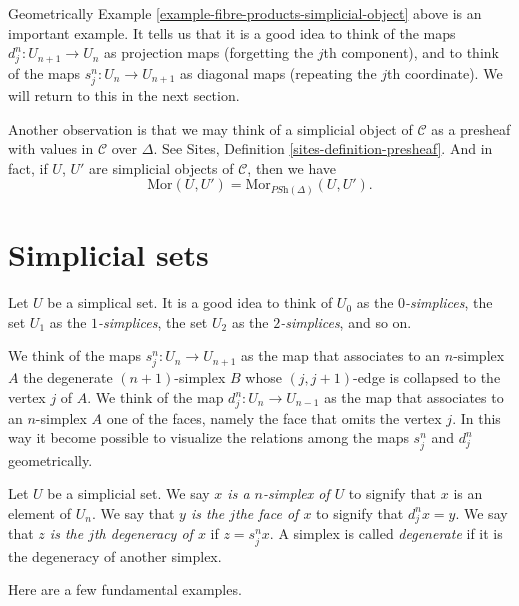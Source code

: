 \noindent
Geometrically Example \ref{example-fibre-products-simplicial-object}
above is an important example. It tells us that it is a good
idea to think of the maps $d^n_j : U_{n + 1} \to U_n$
as projection maps (forgetting the $j$th component),
and to think of the maps $s^n_j : U_n \to U_{n + 1}$
as diagonal maps (repeating the $j$th coordinate).
We will return to this in the next section.

\medskip\noindent
Another observation is that we may think of a simplicial
object of $\mathcal{C}$ as a presheaf with values in $\mathcal{C}$
over $\Delta$. See
Sites, Definition \ref{sites-definition-presheaf}.
And in fact, if $U$, $U'$ are simplicial objects
of $\mathcal{C}$, then we have
\begin{equation}
\label{simplicial-set-presheaf}
\text{Mor}(U, U') = \text{Mor}_{\textit{PSh}(\Delta)}(U, U').
\end{equation}


\section{Simplicial sets}
\label{section-simplicial-set}

\noindent
Let $U$ be a simplical set. It is a good idea to think of
$U_0$ as the {\it $0$-simplices}, the set $U_1$ as the
{\it $1$-simplices},
the set $U_2$ as the {\it $2$-simplices}, and so on.

\medskip\noindent
We think of the maps $s^n_j : U_n \to U_{n + 1}$ as
the map that associates to an $n$-simplex $A$ the degenerate
$(n + 1)$-simplex $B$ whose $(j, j + 1)$-edge is collapsed
to the vertex $j$ of $A$. We think of the map $d^n_j : U_n \to U_{n - 1}$
as the map that associates to an $n$-simplex $A$ one of the
faces, namely the face that omits the vertex $j$.
In this way it become possible to visualize the relations
among the maps $s^n_j$ and $d^n_j$ geometrically.

\begin{definition}
\label{definition-terminology-simplicial-sets}
Let $U$ be a simplicial set. 
We say {\it $x$ is a $n$-simplex of $U$} to signify that
$x$ is an element of $U_n$. We say that {\it $y$ is the $j$the
face of $x$} to signify that $d^n_jx = y$. We say that
{\it $z$ is the $j$th degeneracy of $x$} if $z = s^n_jx$.
A simplex is called {\it degenerate} if it is the degeneracy
of another simplex.
\end{definition}

\noindent
Here are a few fundamental examples.

